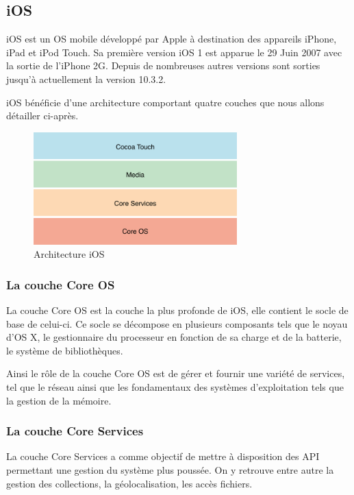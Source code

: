 \documentclass[11]{article}
\begin{document}
\subsection{iOS}
iOS est un OS mobile développé par Apple à destination des appareils iPhone, iPad et iPod Touch.
Sa première version iOS 1 est apparue le 29 Juin 2007 avec la sortie de l’iPhone 2G. Depuis de nombreuses autres versions sont sorties jusqu’à actuellement la version 10.3.2.
 
 \vspace{0.5cm}
 
iOS bénéficie d’une architecture comportant quatre couches que nous allons détailler ci-après.

\begin{figure}[h]
    \centering
    \includegraphics[width=0.7\textwidth]{ios-arch}
    \caption{Architecture iOS}
    \label{bat}
\end{figure}


\subsubsection{La couche Core OS}
La couche Core OS est la couche la plus profonde de iOS, elle contient le socle de base de celui-ci. Ce socle se décompose en plusieurs composants tels que le noyau d’OS X, le gestionnaire du processeur en fonction de sa charge et de la batterie, le système de bibliothèques.
  
 \vspace{0.5cm}
 
Ainsi le rôle de la couche Core OS est de gérer et fournir une variété de services, tel que le réseau ainsi que les fondamentaux des systèmes d’exploitation tels que la gestion de la mémoire.

\subsubsection{La couche Core Services}
La couche Core Services a comme objectif de mettre à disposition des API permettant une gestion du système plus poussée. On y retrouve entre autre la gestion des collections, la géolocalisation, les accès fichiers.
\end{document}
